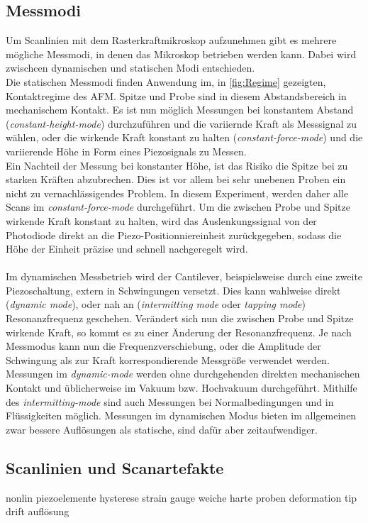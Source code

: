 \subsection{Messmodi}
\label{subsec:messmodi}
Um Scanlinien mit dem Rasterkraftmikroskop aufzunehmen gibt es mehrere mögliche Messmodi, in denen das Mikroskop betrieben werden kann. Dabei wird zwischcen dynamischen und statischen Modi entschieden.\\
Die statischen Messmodi finden Anwendung im, in \autoref{fig:Regime} gezeigten, Kontaktregime des AFM. Spitze und Probe sind in diesem Abstandsbereich in mechanischem Kontakt. Es ist nun möglich Messungen bei konstantem Abstand (\textit{constant-height-mode}) durchzuführen und die variiernde Kraft als Messsignal zu wählen, oder die wirkende Kraft konstant zu halten (\textit{constant-force-mode}) und die variierende Höhe in Form eines Piezosignals zu Messen.\\
Ein Nachteil der Messung bei konstanter Höhe, ist das Risiko die Spitze bei zu starken Kräften abzubrechen. Dies ist vor allem bei sehr unebenen Proben ein nicht zu vernachlässigendes Problem.
In diesem Experiment, werden daher alle Scans im \textit{constant-force-mode} durchgeführt. Um die zwischen Probe und Spitze wirkende Kraft konstant zu halten, wird das Auslenkungssignal von der Photodiode direkt an die Piezo-Positionniereinheit zurückgegeben, sodass die Höhe der Einheit präzise und schnell nachgeregelt wird.\\
\\
Im dynamischen Messbetrieb wird der Cantilever, beispielsweise durch eine zweite Piezoschaltung, extern in Schwingungen versetzt. Dies kann wahlweise direkt (\textit{dynamic mode}), oder nah an (\textit{intermitting mode} oder \textit{tapping mode}) Resonanzfrequenz geschehen. Verändert sich nun die zwischen Probe und Spitze wirkende Kraft, so kommt es zu einer Änderung der Resonanzfrequenz. Je nach Messmodus kann nun die Frequenzverschiebung, oder die Amplitude der Schwingung als zur Kraft korrespondierende Messgröße verwendet werden. Messungen im \textit{dynamic-mode} werden ohne durchgehenden direkten mechanischen Kontakt und üblicherweise im Vakuum bzw. Hochvakuum durchgeführt. Mithilfe des \textit{intermitting-mode} sind auch Messungen bei Normalbedingungen und in Flüssigkeiten möglich.
Messungen im dynamischen Modus bieten im allgemeinen zwar bessere Auflösungen als statische, sind dafür aber zeitaufwendiger.

\subsection{Scanlinien und Scanartefakte}
nonlin piezoelemente
hysterese
strain gauge
weiche harte proben
deformation tip
drift
auflösung

